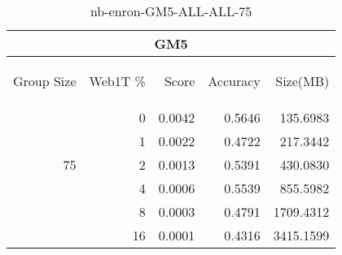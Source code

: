 \begin{center}
\begin{table}[htbp]
\begin{tabular}{ | r | r | r | r | r |}
\hline
\multicolumn{5}{|c|}{GM5}\\
\hline
\begin{sideways}Group Size\end{sideways} & \begin{sideways}Web1T \%\end{sideways} & \begin{sideways}Score\end{sideways} & \begin{sideways}Accuracy\end{sideways} & \begin{sideways}Size(MB)\end{sideways}\\
\hline
\multirow{5}{*}{75}
 & 0 & 0.0042 & 0.5646 & 135.6983\\ \cline{2-5}
 & 1 & 0.0022 & 0.4722 & 217.3442\\ \cline{2-5}
 & 2 & 0.0013 & 0.5391 & 430.0830\\ \cline{2-5}
 & 4 & 0.0006 & 0.5539 & 855.5982\\ \cline{2-5}
 & 8 & 0.0003 & 0.4791 & 1709.4312\\ \cline{2-5}
 & 16 & 0.0001 & 0.4316 & 3415.1599\\ \cline{2-5}
\hline
\end{tabular}
\caption{nb-enron-GM5-ALL-ALL-75}
\label{table:nb-enron-GM5-ALL-ALL-75}
\end{table}
\end{center}

